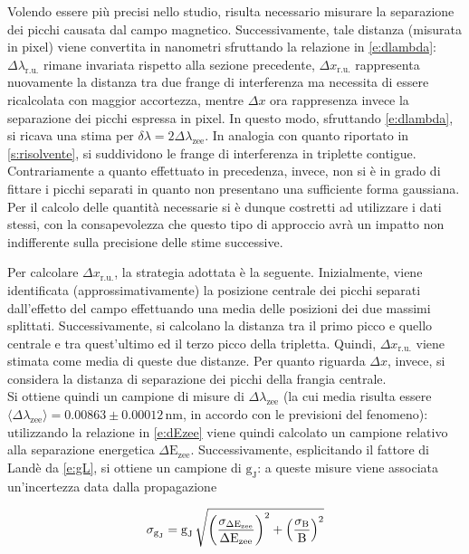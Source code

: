 \documentclass[twocolumn,10pt]{asme2ej}
\begin{document}
\noindent Volendo essere più precisi nello studio, risulta necessario misurare la separazione dei picchi causata dal
campo magnetico. Successivamente, tale distanza (misurata in pixel) viene convertita in nanometri sfruttando la
relazione in \autoref{e:dlambda}: $\Delta\lambda_{\text{r.u.}}$ rimane invariata rispetto alla sezione precedente,
$\Delta x_{\text{r.u.}}$ rappresenta nuovamente la distanza tra due frange di interferenza ma necessita di essere
ricalcolata con maggior accortezza, mentre $\Delta x$ ora rappresenza invece la separazione dei picchi espressa in
pixel. In questo modo, sfruttando \autoref{e:dlambda}, si ricava una stima per $\delta\lambda = 2
\Delta\lambda_{\text{zee}}$. In analogia con quanto riportato in \autoref{s:risolvente}, si suddividono le frange di
interferenza in triplette contigue. Contrariamente a quanto effettuato in precedenza, invece, non si è in grado di
fittare i picchi separati in quanto non presentano una sufficiente forma gaussiana. Per il calcolo delle quantità
necessarie si è dunque costretti ad utilizzare i dati stessi, con la consapevolezza che questo tipo di approccio avrà un
impatto non indifferente sulla precisione delle stime successive.

Per calcolare $\Delta x_{\text{r.u.}}$, la strategia adottata è la seguente. Inizialmente, viene identificata
(approssimativamente) la posizione centrale dei picchi separati dall'effetto del campo effettuando una media delle
posizioni dei due massimi splittati. Successivamente, si calcolano la distanza tra il primo picco e quello centrale e
tra quest'ultimo ed il terzo picco della tripletta. Quindi, $\Delta x_{\text{r.u.}}$ viene stimata come media di queste
due distanze. Per quanto riguarda $\Delta x$, invece, si considera la distanza di separazione dei picchi della frangia
centrale. \\
Si ottiene quindi un campione di misure di $\Delta\lambda_{\text{zee}}$ (la cui media risulta essere
$\langle\Delta\lambda_{\text{zee}}\rangle = 0.00863 \pm 0.00012 \,\si{\nano\metre}$, in accordo con le previsioni del
fenomeno): utilizzando la relazione in \autoref{e:dEzee} viene quindi calcolato un campione relativo alla separazione
energetica $\Delta \text{E}_{\text{zee}}$. Successivamente, esplicitando il fattore di Landè da \autoref{e:gL}, si
ottiene un campione di $\text{g}_{\text{J}}$: a queste misure viene associata un'incertezza data dalla propagazione

\vspace{-15pt}
\begin{equation}
    \sigma_{\text{g}_{\text{J}}} = \text{g}_{\text{J}} \, 
    \sqrt{ 
        \left(\frac{\sigma_{\Delta \text{E}_{\text{zee}}}}{\Delta \text{E}_{\text{zee}}}\right)^2 + 
        \left(\frac{\sigma_{\text{B}}}{\text{B}}\right)^2
        }
    \vspace{-5pt}
\end{equation}
\end{document}
